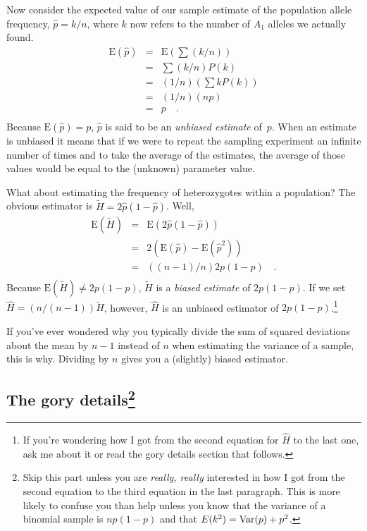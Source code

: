 \documentclass[12pt]{article}
\begin{document}
Now consider the expected value of our sample estimate of the
population allele frequency, $\hat p = k/n$, where $k$ now refers to
the number of $A_1$ alleles we actually found.
\begin{eqnarray*}
\mbox{E}(\hat p) &=& \mbox{E}\left(\sum (k/n)\right) \\
          &=& \sum (k/n) P(k) \\
          &=& (1/n)\left(\sum k P(k)\right) \\
          &=& (1/n)(n p) \\
          &=& p \quad . \\
\end{eqnarray*}
Because $\mbox{E}(\hat p) = p$, $\hat p$ is said to be an {\it
  unbiased estimate} of~$p$. When an estimate
is unbiased it means that if we were to repeat the sampling experiment
an infinite number of times and to take the average of the estimates,
the average of those values would be equal to the (unknown) parameter
value.

What about estimating the frequency of heterozygotes within a
population? The obvious estimator is $\tilde H = 2\hat p (1 - \hat
p)$. Well,
\begin{eqnarray*}
\mbox{E}(\tilde H) &=& \mbox{E}\left(2\hat p (1 - \hat p)\right) \\
     &=& 2\left(\mbox{E}(\hat p) - \mbox{E}({\hat p}^2)\right) \\
     &=& ((n-1)/n)2p(1-p) \quad . \\
\end{eqnarray*}
Because $\mbox{E}(\tilde H) \ne 2p(1-p)$, $\tilde H$ is a {\it biased
estimate\/} of $2p(1-p)$. If we set $\hat H = (n/(n-1))\tilde H$,
however, $\hat H$ is an unbiased estimator of $2p(1-p)$.\footnote{If
  you're wondering how I got from the second equation for $\hat H$ to
  the last one, ask me about it or read the gory details section that
  follows.}

If you've ever wondered why you typically divide the sum of squared
deviations about the mean by $n-1$ instead of $n$ when estimating the
variance of a sample, this is why. Dividing by $n$ gives you a
(slightly) biased estimator.

\subsection*{The gory details\footnote{Skip this part unless
  you are {\it really, really\/} interested in how I got from the
second equation to the third equation in the last paragraph. This is
more likely to confuse you than help unless you know that the variance
of a binomial sample is $np(1-p)$ and that $E(k^2) = \hbox{Var}(p) +
p^2$.}}
\end{document}
